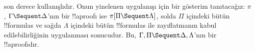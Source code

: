  son derece kullanışlıdır. Onun yinelenen
uygulanışı için bir gösterim tanıtacağız: $\pi$, $\Gamma \Sequent \Delta$'nın
bir !!a{proof}{}ı ise $\pi[\Pi \Sequent \Lambda]$, solda $\Pi$ içindeki bütün
!!{formula}s ve sağda $\Lambda$ içindeki bütün !!{formula}s ile
zayıflatmanın kabul edilebilirliğinin uygulanması sonucudur. Bu, $\Gamma,
\Pi \Sequent \Delta, \Lambda$'nın bir !!a{proof}{}ıdır.

